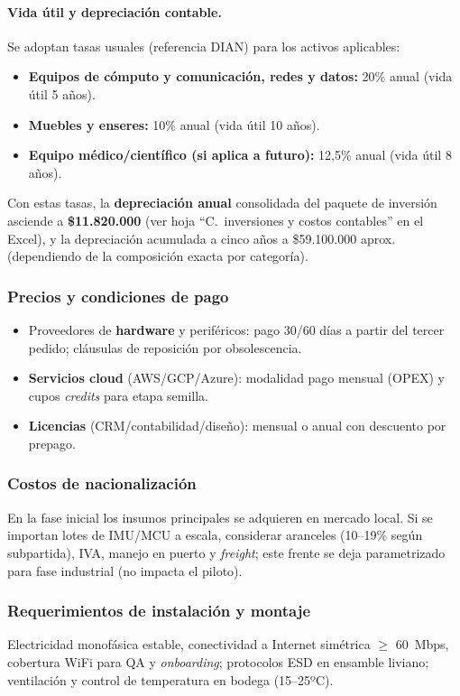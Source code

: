 \paragraph{Vida útil y depreciación contable.}
Se adoptan tasas usuales (referencia DIAN) para los activos aplicables:
\begin{itemize}
    \item \textbf{Equipos de cómputo y comunicación, redes y datos:} 20\% anual (vida útil 5 años).
    \item \textbf{Muebles y enseres:} 10\% anual (vida útil 10 años).
    \item \textbf{Equipo médico/científico (si aplica a futuro):} 12{,}5\% anual (vida útil 8 años).
\end{itemize}
Con estas tasas, la \textbf{depreciación anual} consolidada del paquete de inversión asciende a \textbf{\$11.820.000} (ver hoja ``C.~inversiones y costos contables'' en el Excel), y la depreciación acumulada a cinco años a \$59.100.000 aprox. (dependiendo de la composición exacta por categoría).

\subsubsection{Precios y condiciones de pago}
\begin{itemize}
    \item Proveedores de \textbf{hardware} y periféricos: pago 30/60 días a partir del tercer pedido; cláusulas de reposición por obsolescencia.
    \item \textbf{Servicios cloud} (AWS/GCP/Azure): modalidad pago mensual (OPEX) y cupos \emph{credits} para etapa semilla.
    \item \textbf{Licencias} (CRM/contabilidad/diseño): mensual o anual con descuento por prepago.
\end{itemize}

\subsubsection{Costos de nacionalización}
En la fase inicial los insumos principales se adquieren en mercado local. Si se importan lotes de IMU/MCU a escala, considerar aranceles (10--19\% según subpartida), IVA, manejo en puerto y \emph{freight}; este frente se deja parametrizado para fase industrial (no impacta el piloto).

\subsubsection{Requerimientos de instalación y montaje}
Electricidad monofásica estable, conectividad a Internet simétrica $\geq$ 60~Mbps, cobertura WiFi para QA y \emph{onboarding}; protocolos ESD en ensamble liviano; ventilación y control de temperatura en bodega (15--25ºC).

